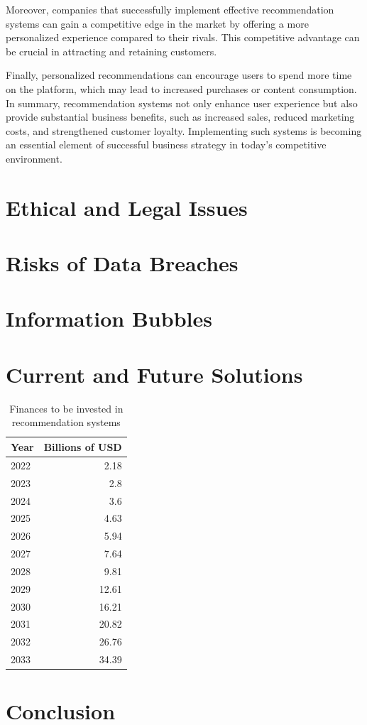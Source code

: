 \documentclass[10pt,twoside,slovak,a4paper]{article}
\begin{document}
Moreover, companies that successfully implement effective recommendation systems can gain a competitive edge in the market by offering a more personalized experience compared to their rivals. This competitive advantage can be crucial in attracting and retaining customers.

Finally, personalized recommendations can encourage users to spend more time on the platform, which may lead to increased purchases or content consumption. In summary, recommendation systems not only enhance user experience but also provide substantial business benefits, such as increased sales, reduced marketing costs, and strengthened customer loyalty. Implementing such systems is becoming an essential element of successful business strategy in today’s competitive environment.

\section{Ethical and Legal Issues} \label{Ethical and Legal Issues}

\section{Risks of Data Breaches} \label{Risks of Data Breaches}

\section{Information Bubbles} \label{Information Bubbles}
 

\section{Current and Future Solutions} \label{Current and Future Solutions}

\begin{table}[ht]
\centering
    \begin{tabular}{l|r}
        Year  & Billions of USD \\\hline
        2022  & 2.18  \\
        2023  & 2.8   \\
        2024  & 3.6   \\
        2025  & 4.63  \\
        2026  & 5.94  \\
        2027  & 7.64  \\
        2028  & 9.81   \\
        2029  & 12.61  \\
        2030  & 16.21  \\
        2031  & 20.82  \\
        2032  & 26.76  \\
        2033  & 34.39  \\
    \end{tabular}
    \caption{Finances to be invested in recommendation systems}
    \label{tab:widgets}
\end{table}
\section{Conclusion} \label{Conclusion}


\newpage


\end{document}
